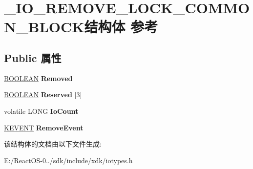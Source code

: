 \hypertarget{struct___i_o___r_e_m_o_v_e___l_o_c_k___c_o_m_m_o_n___b_l_o_c_k}{}\section{\+\_\+\+I\+O\+\_\+\+R\+E\+M\+O\+V\+E\+\_\+\+L\+O\+C\+K\+\_\+\+C\+O\+M\+M\+O\+N\+\_\+\+B\+L\+O\+C\+K结构体 参考}
\label{struct___i_o___r_e_m_o_v_e___l_o_c_k___c_o_m_m_o_n___b_l_o_c_k}
\subsection*{Public 属性}
\begin{DoxyCompactItemize}
\item 
\mbox{\label{struct___i_o___r_e_m_o_v_e___l_o_c_k___c_o_m_m_o_n___b_l_o_c_k_a0d1062524e667820c18b5343ede2a38a}} 
\hyperlink{_processor_bind_8h_a112e3146cb38b6ee95e64d85842e380a}{B\+O\+O\+L\+E\+AN} {\bfseries Removed}
\item 
\mbox{\label{struct___i_o___r_e_m_o_v_e___l_o_c_k___c_o_m_m_o_n___b_l_o_c_k_a6fec4aea0d50a6fe6bbda7c82f965234}} 
\hyperlink{_processor_bind_8h_a112e3146cb38b6ee95e64d85842e380a}{B\+O\+O\+L\+E\+AN} {\bfseries Reserved} \mbox{[}3\mbox{]}
\item 
\mbox{\label{struct___i_o___r_e_m_o_v_e___l_o_c_k___c_o_m_m_o_n___b_l_o_c_k_af4bee01878d0e5df8ac5bd267e6d72ca}} 
volatile L\+O\+NG {\bfseries Io\+Count}
\item 
\mbox{\label{struct___i_o___r_e_m_o_v_e___l_o_c_k___c_o_m_m_o_n___b_l_o_c_k_afac8a07c9df12e558a1b84b8be1326cb}} 
\hyperlink{struct___k_e_v_e_n_t}{K\+E\+V\+E\+NT} {\bfseries Remove\+Event}
\end{DoxyCompactItemize}


该结构体的文档由以下文件生成\+:\begin{DoxyCompactItemize}
\item 
E\+:/\+React\+O\+S-\/0../sdk/include/xdk/iotypes.\+h\end{DoxyCompactItemize}
